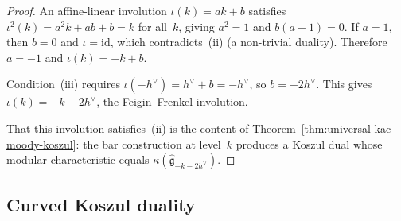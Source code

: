 \begin{proof}
An affine-linear involution $\iota(k) = ak + b$ satisfies
$\iota^2(k) = a^2k + ab + b = k$ for all~$k$, giving $a^2 = 1$
and $b(a+1) = 0$. If $a = 1$, then $b = 0$ and $\iota = \mathrm{id}$,
which contradicts~(ii) (a non-trivial duality). Therefore $a = -1$
and $\iota(k) = -k + b$.

Condition~(iii) requires $\iota(-h^\vee) = h^\vee + b = -h^\vee$,
so $b = -2h^\vee$. This gives $\iota(k) = -k - 2h^\vee$, the
Feigin--Frenkel involution.

That this involution satisfies~(ii) is the content of
Theorem~\ref{thm:universal-kac-moody-koszul}: the bar construction
at level~$k$ produces a Koszul dual whose modular characteristic
equals $\kappa(\widehat{\mathfrak{g}}_{-k-2h^\vee})$.
\end{proof}

\subsection{Curved Koszul duality}

